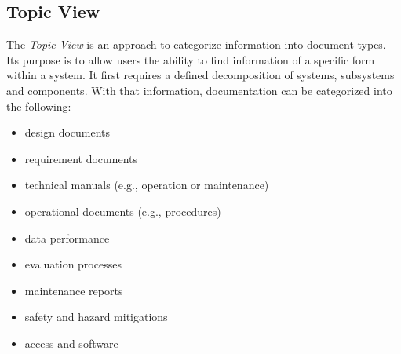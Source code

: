 \subsection{Topic View}

The \emph{Topic View} is an approach to categorize information into document types.
Its purpose is to allow users the ability to find information of a specific form within a system.
It first requires a defined decomposition of systems, subsystems and components.
With that information, documentation can be categorized into the following:

\begin{itemize}
\item design documents
\item requirement documents
\item technical manuals (e.g., operation or maintenance)
\item operational documents (e.g., procedures)
\item data performance
\item evaluation processes
\item maintenance reports
\item safety and hazard mitigations
\item access and software
\end{itemize}

